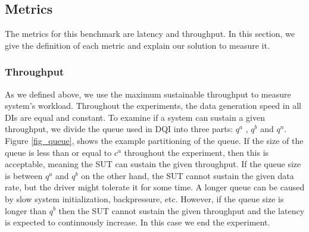 \subsection{Metrics}
The metrics for this benchmark are latency and throughput. In this section, we give the definition of each metric and explain our solution to measure it. 


%


\subsubsection{Throughput}

As we defined above, we use the maximum sustainable throughput to measure system's workload. Throughout the experiments, the data generation speed in all DIs are equal and constant. To examine if a system can sustain a given throughput, we divide the queue used in DQI into three parts: $q^{a}$ , $q^{b}$ and $q^{n}$. Figure \ref{fig_queue}, shows the example partitioning of the queue. If the size of the queue is less than or equal to $c^{a}$ throughout the experiment, then this is acceptable, meaning the SUT can sustain the given throughput. If the queue size is between $q^{a}$ and  $q^{b}$ on the other hand, the SUT cannot sustain the given data rate, but the driver might tolerate it for some time. A longer queue can be caused by slow system initialization, backpressure, etc. However, if the queue size is longer than $q^{b}$ then the SUT cannot sustain the given throughput and the latency is expected to continuously increase. In this case we end the experiment.

